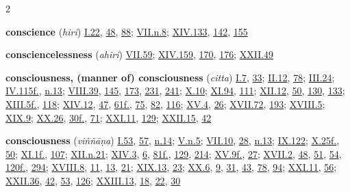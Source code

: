 \begin{multicols}{2}
\begin{vismHanging}
\par\textbf{conscience} (\emph{hiri}) \hyperlink{I.22}{I.22}{}, \hyperlink{I.48}{48}{}, \hyperlink{I.88}{88}{}; \hyperlink{VII.n8}{VII.n.8}{}; \hyperlink{XIV.133}{XIV.133}{}, \hyperlink{XIV.142}{142}{}, \hyperlink{XIV.155}{155}{}
\par\textbf{consciencelessness} (\emph{ahiri}) \hyperlink{VII.59}{VII.59}{}; \hyperlink{XIV.159}{XIV.159}{}, \hyperlink{XIV.170}{170}{}, \hyperlink{XIV.176}{176}{}; \hyperlink{XXII.49}{XXII.49}{}
\par\textbf{consciousness, (manner of) consciousness} (\emph{citta}) \hyperlink{I.7}{I.7}{}, \hyperlink{I.33}{33}{}; \hyperlink{II.12}{II.12}{}, \hyperlink{II.78}{78}{}; \hyperlink{III.24}{III.24}{}; \hyperlink{IV.115}{IV.115f.}{}, \hyperlink{IV.n13}{n.13}{}; \hyperlink{VIII.39}{VIII.39}{}, \hyperlink{VIII.145}{145}{}, \hyperlink{VIII.173}{173}{}, \hyperlink{VIII.231}{231}{}, \hyperlink{VIII.241}{241}{}; \hyperlink{X.10}{X.10}{}; \hyperlink{XI.94}{XI.94}{}, \hyperlink{XI.111}{111}{}; \hyperlink{XII.12}{XII.12}{}, \hyperlink{XII.50}{50}{}, \hyperlink{XII.130}{130}{}, \hyperlink{XII.133}{133}{}; \hyperlink{XIII.5}{XIII.5f.}{}, \hyperlink{XIII.118}{118}{}; \hyperlink{XIV.12}{XIV.12}{}, \hyperlink{XIV.47}{47}{}, \hyperlink{XIV.61}{61f.}{}, \hyperlink{XIV.75}{75}{}, \hyperlink{XIV.82}{82}{}, \hyperlink{XIV.116}{116}{}; \hyperlink{XV.4}{XV.4}{}, \hyperlink{XV.26}{26}{}; \hyperlink{XVII.72}{XVII.72}{}, \hyperlink{XVII.193}{193}{}; \hyperlink{XVIII.5}{XVIII.5}{}; \hyperlink{XIX.9}{XIX.9}{}; \hyperlink{XX.26}{XX.26}{}, \hyperlink{XX.30}{30f.}{}, \hyperlink{XX.71}{71}{}; \hyperlink{XXI.11}{XXI.11}{}, \hyperlink{XXI.129}{129}{}; \hyperlink{XXII.15}{XXII.15}{}, \hyperlink{XXII.42}{42}{}
\par\textbf{consciousness} (\emph{viññāṇa}) \hyperlink{I.53}{I.53}{}, \hyperlink{I.57}{57}{}, \hyperlink{I.n14}{n.14}{}; \hyperlink{V.n5}{V.n.5}{}; \hyperlink{VII.10}{VII.10}{}, \hyperlink{VII.28}{28}{}, \hyperlink{VII.n13}{n.13}{}; \hyperlink{IX.122}{IX.122}{}; \hyperlink{X.25}{X.25f.}{}, \hyperlink{X.50}{50}{}; \hyperlink{XI.1}{XI.1f.}{}, \hyperlink{XI.107}{107}{}; \hyperlink{XII.n21}{XII.n.21}{}; \hyperlink{XIV.3}{XIV.3}{}, \hyperlink{XIV.6}{6}{}, \hyperlink{XIV.81}{81f.}{}, \hyperlink{XIV.129}{129}{}, \hyperlink{XIV.214}{214}{}; \hyperlink{XV.9}{XV.9f.}{}, \hyperlink{XV.27}{27}{}; \hyperlink{XVII.2}{XVII.2}{}, \hyperlink{XVII.48}{48}{}, \hyperlink{XVII.51}{51}{}, \hyperlink{XVII.54}{54}{}, \hyperlink{XVII.120}{120f.}{}, \hyperlink{XVII.294}{294}{}; \hyperlink{XVIII.8}{XVIII.8}{}, \hyperlink{XVIII.11}{11}{}, \hyperlink{XVIII.13}{13}{}, \hyperlink{XVIII.21}{21}{}; \hyperlink{XIX.13}{XIX.13}{}, \hyperlink{XIX.23}{23}{}; \hyperlink{XX.6}{XX.6}{}, \hyperlink{XX.9}{9}{}, \hyperlink{XX.31}{31}{}, \hyperlink{XX.43}{43}{}, \hyperlink{XX.78}{78}{}, \hyperlink{XX.94}{94}{}; \hyperlink{XXI.11}{XXI.11}{}, \hyperlink{XXI.56}{56}{}; \hyperlink{XXII.36}{XXII.36}{}, \hyperlink{XXII.42}{42}{}, \hyperlink{XXII.53}{53}{}, \hyperlink{XXII.126}{126}{}; \hyperlink{XXIII.13}{XXIII.13}{}, \hyperlink{XXIII.18}{18}{}, \hyperlink{XXIII.22}{22}{}, \hyperlink{XXIII.30}{30}{}

\end{vismHanging}
\end{multicols}

